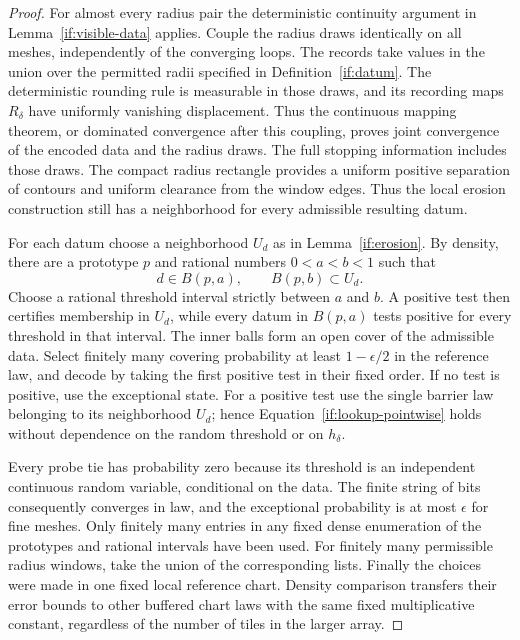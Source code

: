 \begin{proof}
For almost every radius pair the deterministic continuity argument
in Lemma~\ref{if:visible-data} applies.  Couple the radius draws
identically on all meshes, independently of the converging loops.
The records take values in the union over the permitted radii specified
in Definition~\ref{if:datum}. The deterministic rounding rule is
measurable in those draws, and its recording maps $R_\delta$ have
uniformly vanishing displacement. Thus the continuous mapping theorem,
or dominated convergence after this coupling, proves joint convergence
of the encoded data and the radius draws. The full stopping information
includes those draws. The compact radius rectangle
provides a uniform positive separation of contours and uniform
clearance from the window edges.  Thus the local erosion construction
still has a neighborhood for every admissible resulting datum.

For each datum choose a neighborhood $U_d$ as in
Lemma~\ref{if:erosion}.  By density, there are a prototype $p$ and
rational numbers $0<a<b<1$ such that
\[
                  d\in B(p,a),\qquad B(p,b)\subset U_d.
\]
Choose a rational threshold interval strictly between $a$ and $b$.
A positive test then certifies membership in $U_d$, while every
datum in $B(p,a)$ tests positive for every threshold in that interval.
The inner balls form an open cover of the admissible data.  Select
finitely many covering probability at least $1-\epsilon/2$ in the
reference law, and decode by taking the first positive test in
their fixed order.  If no test is positive, use the exceptional
state.  For a positive test use the single barrier law belonging
to its neighborhood $U_d$; hence
Equation~\eqref{if:lookup-pointwise} holds without dependence on
the random threshold or on $h_\delta$.

Every probe tie has probability zero because its threshold is an
independent continuous random variable, conditional on the data.
The finite string of bits consequently converges in law, and the
exceptional probability is at most $\epsilon$ for fine meshes.
Only finitely many entries in any fixed dense enumeration of the
prototypes and rational intervals have been used.  For finitely
many permissible radius windows, take the union of the corresponding
lists.  Finally the choices were made in one fixed local reference
chart.  Density comparison transfers their error bounds to other
buffered chart laws with the same fixed multiplicative constant,
regardless of the number of tiles in the larger array.
\end{proof}
